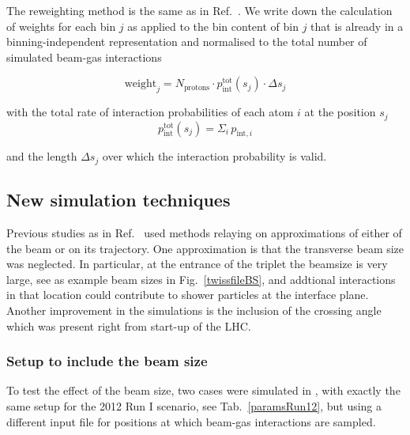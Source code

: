 The reweighting method is the same as in Ref.~\cite{nimPaperRod}. We write down the calculation of weights for each bin $j$ as applied to the bin content of bin $j$ that is already in a binning-independent representation and normalised to the total number of simulated beam-gas interactions 

\begin{equation} \label{eq3}
\mathrm{weight}_j = N_{\mathrm{protons}} \cdot p_{\mathrm{int}}^{\mathrm{tot}} (s_j) \cdot \Delta s_{j} 
\end{equation}

with the total rate of interaction probabilities of each atom $i$ at the position $s_j$ 
\begin{equation*} 
  p_{\mathrm{int}}^{\mathrm{tot}} (s_j) = \Sigma_i \, p_{\textrm{int},i}
\end{equation*}

and the length $\Delta s_{j}$ over which the interaction probability is valid.

\subsection{New simulation techniques}
Previous studies as in Ref.~\cite{nimPaperRod} used methods relaying on approximations of either of the beam or on its trajectory. One approximation is that the transverse beam size was neglected. In particular, at the entrance of the triplet the beamsize is very large, see as example beam sizes in Fig.~\ref{twissfileBS}, and addtional interactions in that location could contribute to shower particles at the interface plane. Another improvement in the simulations is the inclusion of the crossing angle which was present right from start-up of the LHC.

\subsubsection{Setup to include the beam size}
To test the effect of the beam size, two cases were simulated in \fluka, with exactly the same setup for the 2012 Run I scenario, see Tab.~\ref{paramsRun12}, but using a different input file for positions at which beam-gas interactions are sampled.

